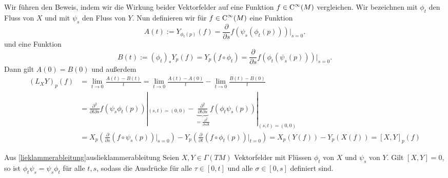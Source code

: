 \begin{beweis}
Wir führen den Beweis, indem wir die Wirkung beider Vektorfelder auf eine Funktion $f \in \cinf{M}$ vergleichen. Wir bezeichnen mit $\phi_t$ den Fluss von $X$ und mit $\psi_s$ den Fluss von $Y$. Nun definieren wir für $f\in \cinf{M}$ eine Funktion 
\begin{equation}
A(t):= Y_{\phi_t(p)}(f) = \frac{\partial}{\partial s} f(\psi_s(\phi_t(p)))|_{s=0}.
\end{equation}
und eine Funktion
\begin{equation}
B(t) := (\phi_t)_\ast Y_p(f) = Y_p(f \circ \phi_t) = \frac{\partial}{\partial s} f(\phi_t(\psi_s(p)))|_{s=0}.
\end{equation}
Dann gilt $A(0)=B(0)$ und außerdem 
\begin{align}
(L_XY)_p (f) &= \lim_{t \to 0} \frac{A(t)-B(t)}{t} = \lim_{t \to 0} \frac{A(t) - A(0)}{t} - \lim_{t \to 0} \frac{B(t)-B(0)}{t}\\
&= \frac{\partial^2}{\partial t \partial s} f(\psi_s \phi_t (p))|_{(s, t)=(0,0)} - \underbrace{\frac{\partial^2}{\partial t \partial s}}_{=\frac{\partial^2}{\partial s \partial t}} f(\phi_t \psi_s (p))|_{(s,t)=(0,0)} \\
&= X_p \left( \frac{\partial}{\partial s} (f \circ \psi_s(p))|_{s=0} \right) - Y_p \left( \frac{\partial}{\partial t} (f \circ \phi_t(p))|_{t=0}\right) = X_p(Y(f))- Y_p(X(f)) = [X, Y]_p (f)
\end{align}
\end{beweis}
\begin{korollar}{Aus \ref{lieklammerableitung}}{auslieklammerableitung}
Seien $X, Y \in \Gamma(TM)$ Vektorfelder mit Flüssen $\phi_t$ von $X$ und $\psi_s$ von $Y$. Gilt $[X, Y] =0$, so ist $\phi_t \psi_s = \psi_s \phi_t$ für alle $t,s$, sodass die Ausdrücke für alle $\tau \in [0,t]$ und alle $\sigma \in [0,s]$ definiert sind.
\end{korollar}
